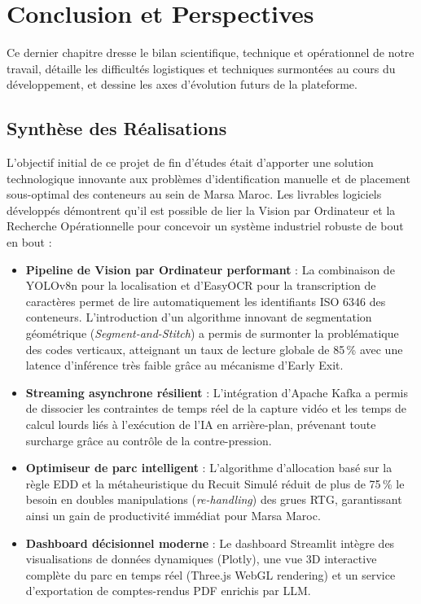 \documentclass[12pt,a4paper]{article}
\begin{document}
\newpage

\section{Conclusion et Perspectives}

Ce dernier chapitre dresse le bilan scientifique, technique et opérationnel de notre travail, détaille les difficultés logistiques et techniques surmontées au cours du développement, et dessine les axes d'évolution futurs de la plateforme.

\subsection{Synthèse des Réalisations}

L'objectif initial de ce projet de fin d'études était d'apporter une solution technologique innovante aux problèmes d'identification manuelle et de placement sous-optimal des conteneurs au sein de Marsa Maroc. Les livrables logiciels développés démontrent qu'il est possible de lier la Vision par Ordinateur et la Recherche Opérationnelle pour concevoir un système industriel robuste de bout en bout :
\begin{itemize}
  \item \textbf{Pipeline de Vision par Ordinateur performant} : La combinaison de YOLOv8n pour la localisation et d'EasyOCR pour la transcription de caractères permet de lire automatiquement les identifiants ISO 6346 des conteneurs. L'introduction d'un algorithme innovant de segmentation géométrique (\textit{Segment-and-Stitch}) a permis de surmonter la problématique des codes verticaux, atteignant un taux de lecture globale de 85\,\% avec une latence d'inférence très faible grâce au mécanisme d'Early Exit.
  \item \textbf{Streaming asynchrone résilient} : L'intégration d'Apache Kafka a permis de dissocier les contraintes de temps réel de la capture vidéo et les temps de calcul lourds liés à l'exécution de l'IA en arrière-plan, prévenant toute surcharge grâce au contrôle de la contre-pression.
  \item \textbf{Optimiseur de parc intelligent} : L'algorithme d'allocation basé sur la règle EDD et la métaheuristique du Recuit Simulé réduit de plus de 75\,\% le besoin en doubles manipulations (\textit{re-handling}) des grues RTG, garantissant ainsi un gain de productivité immédiat pour Marsa Maroc.
  \item \textbf{Dashboard décisionnel moderne} : Le dashboard Streamlit intègre des visualisations de données dynamiques (Plotly), une vue 3D interactive complète du parc en temps réel (Three.js WebGL rendering) et un service d'exportation de comptes-rendus PDF enrichis par LLM.
\end{itemize}
\end{document}
